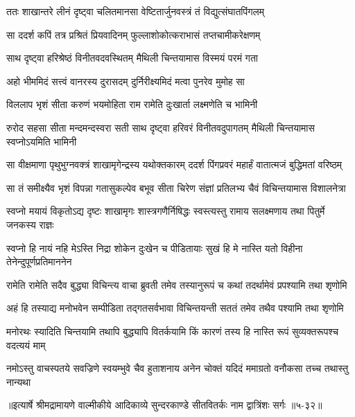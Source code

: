 
\twolineshloka
{ततः शाखान्तरे लीनं दृष्ट्वा चलितमानसा}
{वेष्टितार्जुनवस्त्रं तं विद्युत्संघातपिंगलम्} %

\twolineshloka
{सा ददर्श कपिं तत्र प्रश्रितं प्रियवादिनम्}
{फुल्लाशोकोत्कराभासं तप्तचामीकरेक्षणम्} %

\twolineshloka
{साथ दृष्ट्वा हरिश्रेष्ठं विनीतवदवस्थितम्}
{मैथिली चिन्तयामास विस्मयं परमं गता} %

\twolineshloka
{अहो भीममिदं सत्त्वं वानरस्य दुरासदम्}
{दुर्निरीक्ष्यमिदं मत्वा पुनरेव मुमोह सा} %

\twolineshloka
{विललाप भृशं सीता करुणं भयमोहिता}
{राम रामेति दुःखार्ता लक्ष्मणेति च भामिनी} %

\threelineshloka
{रुरोद सहसा सीता मन्दमन्दस्वरा सती}
{साथ दृष्ट्वा हरिवरं विनीतवदुपागतम्}
{मैथिली चिन्तयामास स्वप्नोऽयमिति भामिनी} %

\twolineshloka
{सा वीक्षमाणा पृथुभुग्नवक्त्रं शाखामृगेन्द्रस्य यथोक्तकारम्}
{ददर्श पिंगप्रवरं महार्हं वातात्मजं बुद्धिमतां वरिष्ठम्} %

\twolineshloka
{सा तं समीक्ष्यैव भृशं विपन्ना गतासुकल्पेव बभूव सीता}
{चिरेण संज्ञां प्रतिलभ्य चैवं विचिन्तयामास विशालनेत्रा} %

\twolineshloka
{स्वप्नो मयायं विकृतोऽद्य दृष्टः शाखामृगः शास्त्रगणैर्निषिद्धः}
{स्वस्त्यस्तु रामाय सलक्ष्मणाय तथा पितुर्मे जनकस्य राज्ञः} %

\twolineshloka
{स्वप्नो हि नायं नहि मेऽस्ति निद्रा शोकेन दुःखेन च पीडितायाः}
{सुखं हि मे नास्ति यतो विहीना तेनेन्दुपूर्णप्रतिमाननेन} %

\twolineshloka
{रामेति रामेति सदैव बुद्ध्या विचिन्त्य वाचा ब्रुवती तमेव}
{तस्यानुरूपं च कथां तदर्थामेवं प्रपश्यामि तथा शृणोमि} %

\twolineshloka
{अहं हि तस्याद्य मनोभवेन सम्पीडिता तद्गतसर्वभावा}
{विचिन्तयन्ती सततं तमेव तथैव पश्यामि तथा शृणोमि} %

\twolineshloka
{मनोरथः स्यादिति चिन्तयामि तथापि बुद्ध्यापि वितर्कयामि}
{किं कारणं तस्य हि नास्ति रूपं सुव्यक्तरूपश्च वदत्ययं माम्} %

\twolineshloka
{नमोऽस्तु वाचस्पतये सवज्रिणे स्वयम्भुवे चैव हुताशनाय}
{अनेन चोक्तं यदिदं ममाग्रतो वनौकसा तच्च तथास्तु नान्यथा} %


॥इत्यार्षे श्रीमद्रामायणे वाल्मीकीये आदिकाव्ये सुन्दरकाण्डे सीतवितर्कः नाम द्वात्रिंशः सर्गः ॥५-३२॥

